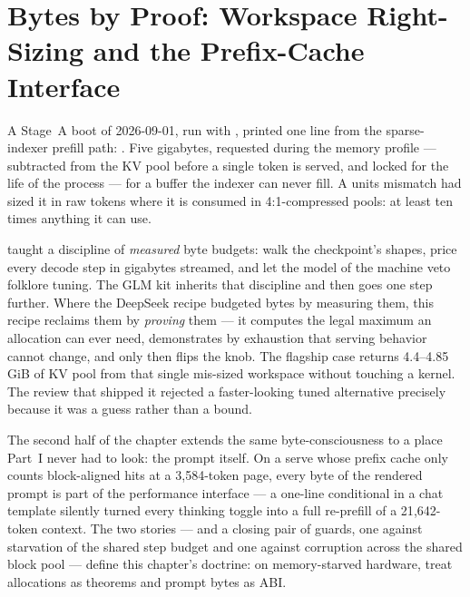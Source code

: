 
\chapter{Bytes by Proof: Workspace Right-Sizing and the Prefix-Cache Interface}
\label{ch:bytes-by-proof}

A Stage~A boot of 2026-09-01, run with ,
printed one line from the sparse-indexer prefill path: . Five gigabytes, requested during the
memory profile --- subtracted from the KV pool before a single token is
served, and locked for the life of the process --- for a buffer the indexer
can never fill. A units mismatch had sized it in raw tokens where it is
consumed in 4:1-compressed pools: at least ten times anything it can use.

 taught a discipline of \emph{measured} byte budgets: walk the
checkpoint's shapes, price every decode step in gigabytes streamed, and let the
model of the machine veto folklore tuning. The GLM kit inherits that discipline
and then goes one step further. Where the DeepSeek recipe budgeted bytes by
measuring them, this recipe reclaims them by \emph{proving} them --- it computes
the legal maximum an allocation can ever need, demonstrates by exhaustion that
serving behavior cannot change, and only then flips the knob. The flagship case
returns 4.4--4.85\,GiB of KV pool from that single mis-sized workspace without
touching a kernel. The review that shipped it rejected a faster-looking
tuned alternative precisely because it was a guess rather than a bound.

The second half of the chapter extends the same byte-consciousness to a place
Part~I never had to look: the prompt itself. On a serve whose prefix cache only
counts block-aligned hits at a 3{,}584-token page, every byte of the rendered
prompt is part of the performance interface --- a one-line conditional in a chat
template silently turned every thinking toggle into a full re-prefill of a
21{,}642-token context. The two stories --- and a closing pair of guards,
one against starvation of the shared step budget and one against corruption
across the shared block pool --- define this chapter's doctrine: on
memory-starved hardware, treat allocations as theorems and prompt bytes as
ABI.

